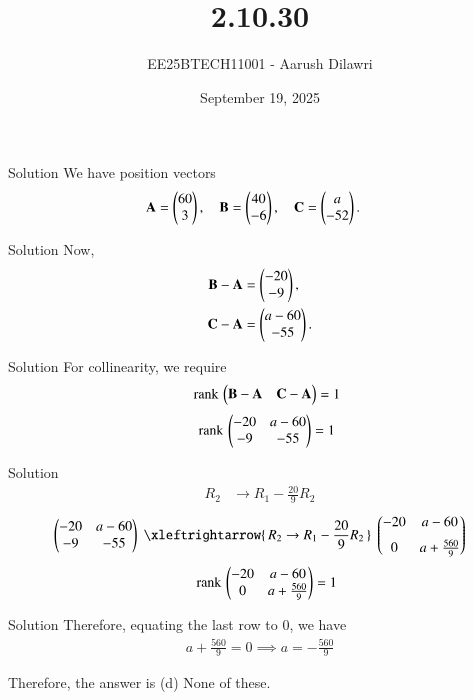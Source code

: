 \documentclass{beamer}
\title{2.10.30}
\date{September 19, 2025}
\author{EE25BTECH11001 - Aarush Dilawri}
\begin{document}
\frame{\titlepage}

\begin{frame}{Solution}
We have position vectors
\begin{align}
\mathbf{A} &= \begin{pmatrix}60 \\ 3\end{pmatrix}, \quad 
\mathbf{B} = \begin{pmatrix}40 \\ -6\end{pmatrix}, \quad 
\mathbf{C} = \begin{pmatrix}a \\ -52\end{pmatrix}.
\end{align}
\end{frame}
\begin{frame}{Solution}
    Now,
    \begin{align}
    \mathbf{B} - \mathbf{A} &= \begin{pmatrix}-20 \\ -9\end{pmatrix}, \\
    \mathbf{C} - \mathbf{A} &= \begin{pmatrix}a-60 \\ -55\end{pmatrix}.
\end{align}
\end{frame}
    
\begin{frame}{Solution}
    For collinearity, we require
\begin{align}
    \quad \text{rank}\,\begin{pmatrix}\mathbf{B}-\mathbf{A} & \mathbf{C}-\mathbf{A}\end{pmatrix} = 1
\end{align}
\begin{align}
    \quad \text{rank}\,\begin{pmatrix}-20 & a-60 \\ -9 & -55\end{pmatrix} = 1
\end{align}
\end{frame}


\begin{frame}{Solution}
\begin{align}
R_2 &\to R_1 - \tfrac{20}{9}R_2
\end{align}
\begin{align}
\myvec{-20 & a-60 \\ -9 & -55}
\;\xleftrightarrow{\,R_2 \to R_1 - \frac{20}{9}R_2\,}\;
\myvec{-20 & a-60 \\[6pt] 0 & a + \frac{560}{9}}
\end{align}
\begin{align}
    \quad \text{rank}\,\begin{pmatrix}-20 & a-60 \\ 0 & a + \frac{560}{9}\end{pmatrix} = 1
\end{align}
\end{frame}
\begin{frame}{Solution}
Therefore, equating the last row to 0, we have
\begin{align}
    a + \frac{560}{9} = 0
    \implies a = -\frac{560}{9}
\end{align}

Therefore, the answer is (d) None of these.
\end{frame}
\end{document}
